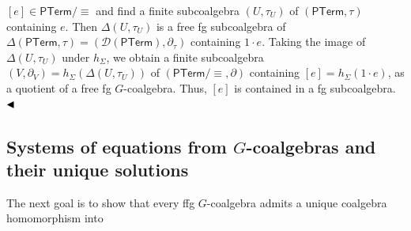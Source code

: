 \hypertarget{html:S6.SS0.SSS0.P0.SPx3.p1.m6}{}\({[e]\in\mathsf{PTerm}/{\equiv}}\) and find a finite subcoalgebra %
\hypertarget{html:S6.SS0.SSS0.P0.SPx3.p1.m7}{}\({(U,\tau_{U})}\) of %
\hypertarget{html:S6.SS0.SSS0.P0.SPx3.p1.m8}{}\({(\mathsf{PTerm},\tau)}\) containing %
\hypertarget{html:S6.SS0.SSS0.P0.SPx3.p1.m9}{}\({e}\). Then %
\hypertarget{html:S6.SS0.SSS0.P0.SPx3.p1.m10}{}\({\Delta(U,\tau_{U})}\) is a free fg subcoalgebra of %
\hypertarget{html:S6.SS0.SSS0.P0.SPx3.p1.m11}{}\({\Delta(\mathsf{PTerm},\tau)=({\mathcal{D}}(\mathsf{PTerm}),\partial_{\tau})}\) containing %
\hypertarget{html:S6.SS0.SSS0.P0.SPx3.p1.m12}{}\({1\cdot e}\). Taking the image of %
\hypertarget{html:S6.SS0.SSS0.P0.SPx3.p1.m13}{}\({\Delta(U,\tau_{U})}\) under %
\hypertarget{html:S6.SS0.SSS0.P0.SPx3.p1.m14}{}\({h_{\Sigma}}\), we obtain a finite subcoalgebra %
\hypertarget{html:S6.SS0.SSS0.P0.SPx3.p1.m15}{}\({(V,\partial_{V})=h_{\Sigma}(\Delta(U,\tau_{U}))}\) of %
\hypertarget{html:S6.SS0.SSS0.P0.SPx3.p1.m16}{}\({(\mathsf{PTerm}/{\equiv},\partial)}\) containing %
\hypertarget{html:S6.SS0.SSS0.P0.SPx3.p1.m17}{}\({[e]=h_{\Sigma}(1\cdot e)}\), as a quotient of a free fg %
\hypertarget{html:S6.SS0.SSS0.P0.SPx3.p1.m18}{}\({G}\)-coalgebra. Thus, %
\hypertarget{html:S6.SS0.SSS0.P0.SPx3.p1.m19}{}\({[e]}\) is contained in a fg subcoalgebra. %
\hypertarget{html:S6.SS0.SSS0.P0.SPx3.p1.m20}{}\({\hfill\blacktriangleleft}\)
\par\medskip
\hypertarget{html:S6.SSx1}{} %
\hypertarget{html:S6.SSx1.m1}{}\subsection*{Systems of equations from \({G}\)-coalgebras and their unique solutions}
\hypertarget{html:S6.SSx1.p1}{} The next goal is to show that every ffg %
\hypertarget{html:S6.SSx1.p1.m1}{}\({G}\)-coalgebra admits a unique coalgebra homomorphism into %
